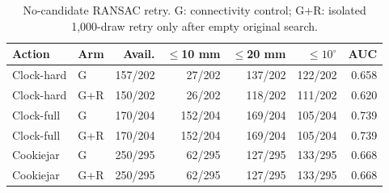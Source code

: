 \begin{table}[t]\centering\scriptsize
\caption{No-candidate RANSAC retry. G: connectivity control; G+R: isolated 1,000-draw retry only after empty original search.}
\label{tab:ransac-empty-retry}
\begin{tabular}{llrrrrr}\toprule
Action & Arm & Avail. & $\leq$10 mm & $\leq$20 mm & $\leq10^\circ$ & AUC\\\midrule
Clock-hard & G & 157/202 & 27/202 & 137/202 & 122/202 & 0.658\\
Clock-hard & G+R & 150/202 & 26/202 & 118/202 & 111/202 & 0.620\\
Clock-full & G & 170/204 & 152/204 & 169/204 & 105/204 & 0.739\\
Clock-full & G+R & 170/204 & 152/204 & 169/204 & 105/204 & 0.739\\
Cookiejar & G & 250/295 & 62/295 & 127/295 & 133/295 & 0.668\\
Cookiejar & G+R & 250/295 & 62/295 & 127/295 & 133/295 & 0.668\\
\bottomrule\end{tabular}\end{table}
